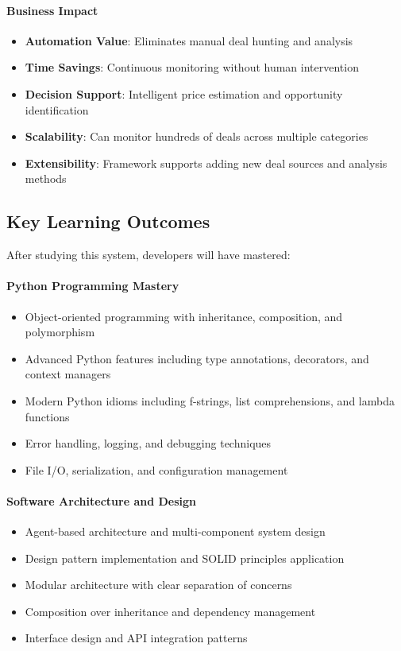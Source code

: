 \paragraph{Business Impact \starfull\starfull\starfull\starfull\starempty}
\begin{itemize}
\item \textbf{Automation Value}: Eliminates manual deal hunting and analysis
\item \textbf{Time Savings}: Continuous monitoring without human intervention
\item \textbf{Decision Support}: Intelligent price estimation and opportunity identification
\item \textbf{Scalability}: Can monitor hundreds of deals across multiple categories
\item \textbf{Extensibility}: Framework supports adding new deal sources and analysis methods
\end{itemize}

\subsection{Key Learning Outcomes}

After studying this system, developers will have mastered:

\paragraph{Python Programming Mastery}
\begin{itemize}
\item Object-oriented programming with inheritance, composition, and polymorphism
\item Advanced Python features including type annotations, decorators, and context managers
\item Modern Python idioms including f-strings, list comprehensions, and lambda functions
\item Error handling, logging, and debugging techniques
\item File I/O, serialization, and configuration management
\end{itemize}

\paragraph{Software Architecture and Design}
\begin{itemize}
\item Agent-based architecture and multi-component system design
\item Design pattern implementation and SOLID principles application
\item Modular architecture with clear separation of concerns
\item Composition over inheritance and dependency management
\item Interface design and API integration patterns
\end{itemize}

